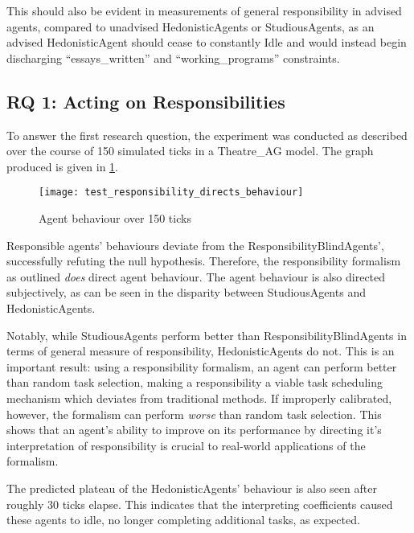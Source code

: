 This should also be evident in measurements of general responsibility in advised agents, compared to unadvised HedonisticAgents or StudiousAgents, as an advised HedonisticAgent should cease to constantly Idle and would instead begin discharging ``essays\_written'' and ``working\_programs'' constraints.\par

\subsection{RQ 1: Acting on Responsibilities}
To answer the first research question, the experiment was conducted as described over the course of 150 simulated ticks in a Theatre\_AG model. The graph produced is given in \cref{fig:behaviour_direction}.

\begin{figure}[h]
    \centering
    \texttt{[image: test\_responsibility\_directs\_behaviour]}
    \caption{Agent behaviour over 150 ticks}
    \label{fig:behaviour_direction}
\end{figure}

Responsible agents' behaviours deviate from the ResponsibilityBlindAgents', successfully refuting the null hypothesis. Therefore, the responsibility formalism as outlined \emph{does} direct agent behaviour. The agent behaviour is also directed subjectively, as can be seen in the disparity between StudiousAgents and HedonisticAgents.\par

Notably, while StudiousAgents perform better than ResponsibilityBlindAgents in terms of general measure of responsibility, HedonisticAgents do not. This is an important result: using a responsibility formalism, an agent can perform better than random task selection, making a responsibility a viable task scheduling mechanism which deviates from traditional methods. If improperly calibrated, however, the formalism can perform \emph{worse} than random task selection. This shows that an agent's ability to improve on its performance by directing it's interpretation of responsibility is crucial to real-world applications of the formalism.\par

The predicted plateau of the HedonisticAgents' behaviour is also seen after roughly 30 ticks elapse. This indicates that the interpreting coefficients caused these agents to idle, no longer completing additional tasks, as expected.\par


